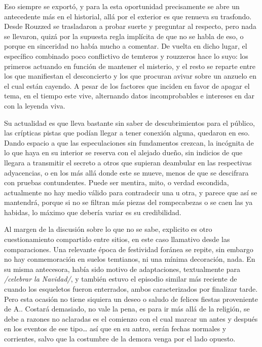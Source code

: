 \documentclass[
]{book}
\begin{document}
Eso siempre se exportó, y para la esta oportunidad precisamente se abre un antecedente más en el historial, allá por el exterior es que renueva su trasfondo. Desde Rouzzed se trasladaron a probar suerte y preguntar al respecto, pero nada se llevaron, quizá por la supuesta regla implícita de que no se habla de eso, o porque en sinceridad no había mucho a comentar. De vuelta en dicho lugar, el específico combinado poco conflictivo de temteros y rouzzeros hace lo suyo: los primeros actuando en función de mantener el misterio, y el resto se reparte entre los que manifiestan el desconcierto y los que procuran avivar sobre un anzuelo en el cual están cayendo. A pesar de los factores que inciden en favor de apagar el tema, en el tiempo este vive, alternando datos incomprobables e intereses en dar con la leyenda viva.

Su actualidad es que lleva bastante sin saber de descubrimientos para el público, las crípticas pistas que podían llegar a tener conexión alguna, quedaron en eso. Dando espacio a que las especulaciones sin fundamentos crezcan, la incógnita de lo que haya en su interior se reserva con el alejado dueño, sin indicios de que llegara a transmitir el secreto a otros que supieran deambular en las respectivas adyacencias, o en los más allá donde este se mueve, menos de que se descifrara con pruebas contundentes. Puede ser mentira, mito, o verdad escondida, actualmente no hay medio válido para contradecir una u otra, y parece que así se mantendrá, porque si no se filtran más piezas del rompecabezas o se caen las ya habidas, lo máximo que debería variar es su credibilidad.

Al margen de la discusión sobre lo que no se sabe, explicito es otro cuestionamiento compartido entre sitios, en este caso llamativo desde las comparaciones. Una relevante época de festividad foránea se repite, sin embargo no hay conmemoración en suelos temtianos, ni una mínima decoración, nada. En su misma antecesora, había sido motivo de adaptaciones, textualmente para \emph{/celebrar la Navidad/}, y también estuvo el episodio similar más reciente de cuando los esqueletos fueron enterrados, ambos caracterizados por finalizar tarde. Pero esta ocasión no tiene siquiera un deseo o saludo de felices fiestas proveniente de A.. Costará demasiado, no vale la pena, es para ir más allá de la religión, se debe a razones no aclaradas es el comienzo con el cual marcar un antes y después en los eventos de ese tipo\ldots{} así que en su antro, serán fechas normales y corrientes, salvo que la costumbre de la demora venga por el lado opuesto.
\end{document}
